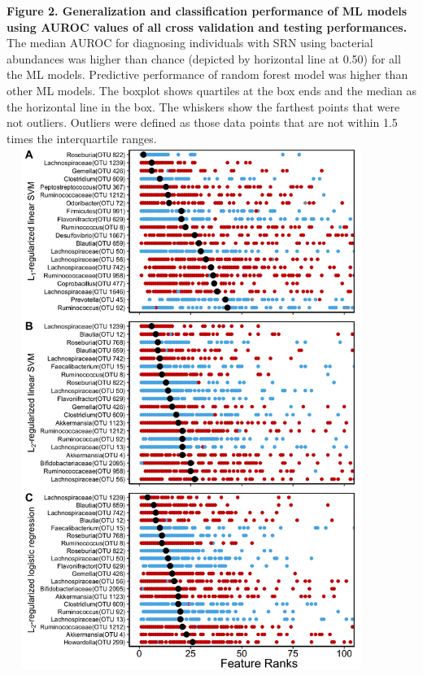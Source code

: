 \documentclass[11pt,]{article}
\begin{document}
\textbf{Figure 2. Generalization and classification performance of ML
models using AUROC values of all cross validation and testing
performances. } The median AUROC for diagnosing individuals with SRN
using bacterial abundances was higher than chance (depicted by
horizontal line at 0.50) for all the ML models. Predictive performance
of random forest model was higher than other ML models. The boxplot
shows quartiles at the box ends and the median as the horizontal line in
the box. The whiskers show the farthest points that were not outliers.
Outliers were defined as those data points that are not within 1.5 times
the interquartile ranges. \newpage
\includegraphics[height=17cm, width=12cm]{Figure_3.png}
\end{document}
